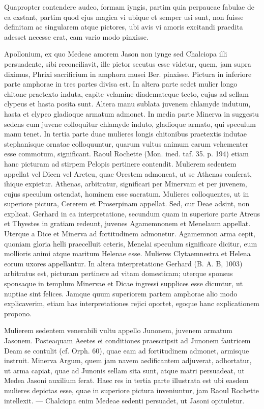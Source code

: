 \documentclass[landscape, a4paper, 11pt, oneside, polutonikogreek, german]{article}
\begin{document}
Quapropter contendere audeo, formam iyngis, partim quia perpaucae fabulae de ea exstant, partim quod ejus magica vi ubique et semper usi sunt, non fuisse definitam ac singularem atque pictores, ubi avis vi amoris excitandi praedita adesset necesse erat, eam vario modo pinxisse.

Apollonium, ex quo Medeae amorem Jason non iynge sed Chalciopa illi persuadente, sibi reconciliavit, ille pictor secutus esse videtur, quem, jam supra diximus, Phrixi sacrificium in amphora musei Ber. pinxisse. Pictura in inferiore parte amphorae in tres partes divisa est. In altera parte sedet mulier longo chitone praetexto induta, capite velamine diademateque tecto, cujus ad sellam clypeus et hasta posita sunt. Altera manu sublata juvenem chlamyde indutum, hasta et clypeo gladioque armatum admonet. In media parte Minerva in suggestu sedens cum juvene colloquitur chlamyde induto, gladioque armato, qui speculum manu tenet. In tertia parte duae mulieres longis chitonibus praetextis indutae stephanisque ornatae colloquuntur, quarum vultus animum earum vehementer esse commotum, significant. Raoul Rochette (Mon. ined. taf. 35. p. 194) etiam hanc picturam ad stirpem Pelopis pertinere contendit. Mulierem sedentem appellat vel Dicen vel Areteu, quae Orestem admoneat, ut se Athenas conferat, ihique expietur. Athenas, arbitratur, significari per Minervam et per juvenem, cujus speculum ostendat, hominem esse sacratum. Mulieres colloquentes, ut in superiore pictura, Cererem et Proserpinam appellat. Sed, cur Deae adsint, non explicat. Gerhard in ea interpretatione, secundum quam in superiore parte Atreus et Thyestes in gratiam redeunt, juvenes Agamemnonem et Menelaum appellat. Uterque a Dice et Minerva ad fortitudinem admonetur. Agamemnon arma cepit, quoniam gloria helli praecelluit ceteris, Menelai speculum significare dicitur, eum mollioris animi atque maritum Helenae esse. Mulieres Clytaemnestra et Helena eorum uxores appellantur. In altera interpretatione Gerhard (B. A. B, 1003) arbitratus est, picturam pertinere ad vitam domesticam; uterque sponsus sponsaque in templum Minervae et Dicae ingressi supplices esse dicuntur, ut nuptiae sint felices. Jamque quum superiorem partem amphorae alio modo explicaverim, etiam has interpretationes rejici oportet, egoque hanc explicationem propono.

Mulierem sedentem venerabili vultu appello Junonem, juvenem armatum Jasonem. Posteaquam Aeetes ei conditiones praescripsit ad Junonem fautricem Deam se contulit (cf. Orph. 60), quae eam ad fortitudinem admonet, armisque instruit. Minerva Argum, quem jam navem aedificantem adjuverat, adhortatur, ut arma capiat, quae ad Junonis sellam sita sunt, atque matri persuadeat, ut Medea Jasoni auxilium ferat. Haec res in tertia parte illustrata est ubi easdem mulieres depictas esse, quae in superiore pictura inveniuntur, jam Raoul Rochette intellexit. --- Chalciopa enim Medeae sedenti persuadet, ut Jasoni opituletur.
\end{document}
